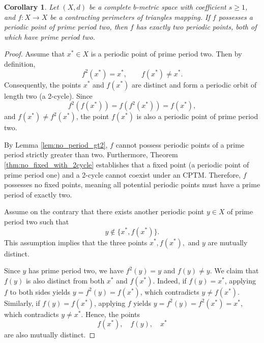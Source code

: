 \documentclass[a4paper,12pt,oneside]{article}
\newtheorem{corollary}[theorem]{Corollary}
\numberwithin{equation}{section}
\begin{document}
\begin{corollary}
\label{cor:exactly_two_periodic}
Let $(X,d)$ be a complete $b$-metric space with coefficient $s\geq 1$, and $f:X\to X$ be a contracting perimeters of triangles mapping. If $f$ possesses a periodic point of prime period two, then $f$ has exactly two periodic points, both of which have prime period two.
\end{corollary}

\begin{proof}
Assume that $x^{*}\in X$ is a periodic point of prime period two. Then by definition,
\[
f^{2}(x^{*}) = x^{*},\qquad f(x^{*})\neq x^{*}.
\]
Consequently, the points $x^{*}$ and $f(x^{*})$ are distinct and form a periodic orbit of length two (a 2-cycle). Since
\[
f^{2}(f(x^{*})) = f(f^{2}(x^{*})) = f(x^{*}),
\]
and $f(x^{*})\neq f^{2}(x^{*})$, the point $f(x^{*})$ is also a periodic point of prime period two.

By Lemma \ref{lem:no_period_gt2}, $f$ cannot possess periodic points of a prime period strictly greater than two. Furthermore, Theorem \ref{thm:no_fixed_with_2cycle} establishes that a fixed point (a periodic point of prime period one) and a 2-cycle cannot coexist under an CPTM. Therefore, $f$ possesses no fixed points, meaning all potential periodic points must have a prime period of exactly two.

Assume on the contrary that there exists another periodic point $y\in X$ of prime period two such that
\[
y\notin \{x^{*},f(x^{*})\}.
\]
This assumption implies that the three points $x^{*},f(x^{*}),$ and $y$ are mutually distinct.

Since $y$ has prime period two, we have $f^{2}(y) = y$ and $f(y)\neq y$. We claim that $f(y)$ is also distinct from both $x^{*}$ and $f(x^{*})$. Indeed, if $f(y) = x^{*}$, applying $f$ to both sides yields $y = f^{2}(y) = f(x^{*})$, which contradicts $y\neq f(x^{*})$. Similarly, if $f(y) = f(x^{*})$, applying $f$ yields $y = f^{2}(y) = f^{2}(x^{*}) = x^{*}$, which contradicts $y\neq x^{*}$. Hence, the points
\[
f(x^{*}),\quad f(y),\quad x^{*}
\]
are also mutually distinct.


\end{proof}
\end{document}
